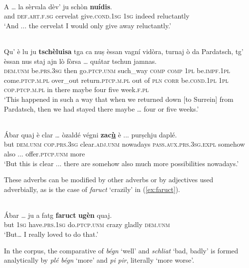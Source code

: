 \ea
\label{}
\\
\gll A … la sèrvala dèv’ ju schòn \textbf{nuídis}.    \\
and {} \textsc{def.art.f.sg} cervelat give.\textsc{cond.1sg} \textsc{1sg} indeed reluctantly\\
\glt `And ... the cervelat I would only give away reluctantly.'
\z

\ea
\label{}
\\
\gll  Qu' è lu ju \textbf{tschèluisa} tga ca nuṣ èssan vagní vidòra, turnaj ò da Pardatsch, tg' èssan nus staj ajn lò fòrsa … quátar tschun jamnas.  \\
\textsc{dem.unm} be.\textsc{prs.3sg} then go.\textsc{ptcp.unm} such\_way \textsc{comp} \textsc{comp} \textsc{1pl} be.\textsc{impf.1pl} come.\textsc{ptcp.m.pl} over\_out return.\textsc{ptcp.m.pl} out of \textsc{pln} \textsc{corr} be.\textsc{cond.1pl} \textsc{1pl} \textsc{cop.ptcp.m.pl} in there maybe {} four five week.\textsc{f.pl}   \\
\glt `This happened in such a way that when we returned down [to Surrein] from Pardatsch, then we had stayed there maybe … four or five weeks.'
\z


\ea
\label{}
\\
\gll Ábar quaj è clar … òzaldé végni \textbf{zac\underline{ù}} è ...  purṣchju daplé.   \\
	but \textsc{dem.unm} \textsc{cop.prs.3sg} clear.\textsc{adj.unm} {} nowadays \textsc{pass.aux.prs.3sg.expl} somehow also ... offer.\textsc{ptcp.unm} more\\
\glt `But this is clear ... there are somehow also much more possibilities nowadays.'
\z

These adverbs can be modified by other adverbs or by adjectives used adverbially, as is the case of \textit{faruct} `crazily' in (\ref{ex:faruct}).

\ea
\label{ex:faruct}
\\
\gll  Ábar … ju a fatg \textbf{faruct} \textbf{ugèn} quaj.\\
but {} \textsc{1sg} have.\textsc{prs.1sg} do.\textsc{ptcp.unm} crazy gladly \textsc{dem.unm} \\ 
\glt `But… I really loved to do that.'
\z


In the corpus, the comparative of \textit{bégn} `well' and \textit{schliat} `bad, badly' is formed analytically by \textit{plé bégn} `more' and \textit{pi pir}, literally `more worse'.

